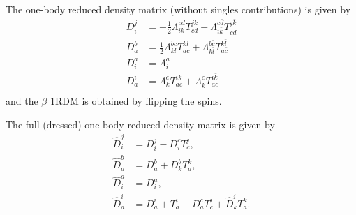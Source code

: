 \documentclass[a4paper,12pt,oneside]{book}
\newcommand{\spa}[1]{{#1}}
\newcommand{\spb}[1]{\bar{#1}}
\newcommand{\half}{\frac{1}{2}}
\begin{document}
The one-body reduced density matrix (without singles contributions) is given by
\begin{equation}
\begin{aligned}
  D_{\spa{i}}^{\spa{j}} &= - \half\Lambda_{\spa{i}\spa{k}}^{\spa{c}\spa{d}} T^{\spa{j}\spa{k}}_{\spa{c}\spa{d}} 
  -\Lambda_{\spa{i}\spb{k}}^{\spa{c}\spb{d}} T^{\spa{j}\spb{k}}_{\spa{c}\spb{d}}\\
  D_{\spa{a}}^{\spa{b}} &= \half\Lambda_{\spa{k}\spa{l}}^{\spa{b}\spa{c}} T^{\spa{k}\spa{l}}_{\spa{a}\spa{c}}
  +\Lambda_{\spa{k}\spb{l}}^{\spa{b}\spb{c}} T^{\spa{k}\spb{l}}_{\spa{a}\spb{c}}\\
  D_{\spa{i}}^{\spa{a}} &= \Lambda_{\spa{i}}^{\spa{a}} \\
  D_{\spa{a}}^{\spa{i}} &= \Lambda_{\spa{k}}^{\spa{c}} T^{\spa{i}\spa{k}}_{\spa{a}\spa{c}} 
  + \Lambda_{\spb{k}}^{\spb{c}} T^{\spa{i}\spb{k}}_{\spa{a}\spb{c}}\\
\end{aligned}
\end{equation}
and the $\beta$ 1RDM is obtained by flipping the spins.

The full (dressed) one-body reduced density matrix is given by
\begin{equation}
\begin{aligned}
  \hat D_{\spa{i}}^{\spa{j}} &= D_{\spa{i}}^{\spa{j}} - D_{\spa{i}}^{\spa{c}} T^{\spa{j}}_{\spa{c}}, \\
  \hat D_{\spa{a}}^{\spa{b}} &= D_{\spa{a}}^{\spa{b}} + D_{\spa{k}}^{\spa{b}} T^{\spa{k}}_{\spa{a}}, \\
  \hat D_{\spa{i}}^{\spa{a}} &= D_{\spa{i}}^{\spa{a}},\\
  \hat D_{\spa{a}}^{\spa{i}} &= D_{\spa{a}}^{\spa{i}} + T^{\spa{i}}_{\spa{a}} 
  - D_{\spa{a}}^{\spa{c}} T^{\spa{i}}_{\spa{c}} + \hat D_{\spa{k}}^{\spa{i}} T^{\spa{k}}_{\spa{a}}.
\end{aligned}
\end{equation}
\end{document}
